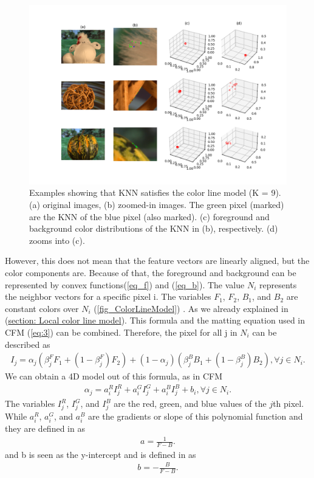 \begin{figure}[htb]
	\begin{center}
		\includegraphics[width=400pt]{bilder/clm}
		\caption{Examples showing that KNN satisfies the color line model (K = 9).
			(a) original images, (b) zoomed-in images. The green pixel\textit{} (marked) are the KNN of the blue pixel (also marked). (c) foreground and background color distributions of the KNN in (b), respectively. (d) zooms into (c).}\label{fig_knn_in_action}
	\end{center}
\end{figure}

However, this does not mean that the feature vectors are linearly aligned, but the color components are. 
Because of that, the foreground and background can be represented by convex functions(\ref{eq_f}) and (\ref{eq_b}).
The value \( N_i\) represents the neighbor vectors for a specific pixel i. The variables \(F_1\), \(F_2\), \(B_1\), and \(B_2\) are constant colors over \(N_i\) (\ref{fig_ColorLineModel}) . As we already explained in (\hyperref[sec:localcolor]{section: Local color line model}). This formula and the matting equation used in CFM (\ref{eq:3}) can be combined. Therefore, the pixel for all j in \(N_i\) can be described as
\begin{align}
	I_j = \alpha_j(\beta_{j}^F F_1 + (1 - \beta_{j}^F)F_2) + (1- \alpha_j)(\beta_{j}^B B_1 + (1-\beta_{j}^B)B_2), \forall j \in N_i .
\end{align} 
We can obtain a 4D model out of this formula, as in CFM 
\begin{align} \label{eq:14}
	\alpha_j = a_i^R I_j^R + a_i^G I_j^G + a_i^B I_j^B + b_i, \forall j \in N_i .
\end{align} 
The variables \(I_j^R\), \(I_j^G\), and \(I_j^B\) are the red, green, and blue values of the \(j\)th pixel. While \(a_i^R\), \(a_i^G\), and \(a_i^B\) are the gradients or slope of this polynomial function and they are defined in \cite{cf} as
\begin{align}
	a  = \frac{1}{F-B}.
\end{align}  
and b is seen as the y-intercept and is defined in \cite{cf} as
\begin{align}
	b  = -\frac{B}{F-B}.
\end{align}  

